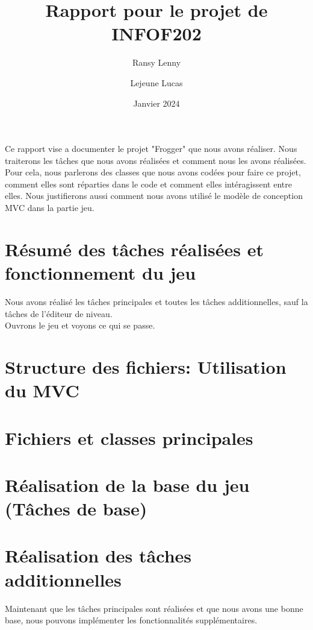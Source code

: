 \documentclass[a4paper, 12pt]{article}
\title{\textbf{Rapport pour le projet de INFOF202}}
\author{
    Ransy Lenny
    \and
    Lejeune Lucas
    }
\date{Janvier 2024}
\begin{document}
\maketitle

Ce rapport vise a documenter le projet "Frogger" que nous avons réaliser. Nous traiterons les tâches que nous avons réalisées et comment nous les avons réalisées. Pour cela, nous parlerons des classes que nous avons codées pour faire ce projet, comment elles sont réparties dans le code et comment elles intéragissent entre elles. Nous justifierons aussi comment nous avons utilisé le modèle de conception MVC dans la partie jeu.

\tableofcontents

\pagebreak

\section{Résumé des tâches réalisées et fonctionnement du jeu}
Nous avons réalisé les tâches principales et toutes les tâches additionnelles, sauf la tâches de l'éditeur de niveau. \\
Ouvrons le jeu et voyons ce qui se passe. 


\section{Structure des fichiers: Utilisation du MVC}


\section{Fichiers et classes principales}

\section{Réalisation de la base du jeu (Tâches de base)}

\section{Réalisation des tâches additionnelles}
Maintenant que les tâches principales sont réalisées et que nous avons une bonne base, nous pouvons implémenter les fonctionnalités supplémentaires.
\end{document}
